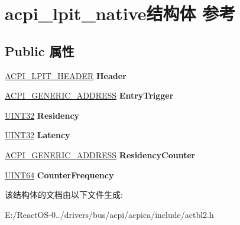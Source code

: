 \hypertarget{structacpi__lpit__native}{}\section{acpi\+\_\+lpit\+\_\+native结构体 参考}
\label{structacpi__lpit__native}
\subsection*{Public 属性}
\begin{DoxyCompactItemize}
\item 
\mbox{\label{structacpi__lpit__native_a3e0cb0780559be37da85e23652a056ac}} 
\hyperlink{structacpi__lpit__header}{A\+C\+P\+I\+\_\+\+L\+P\+I\+T\+\_\+\+H\+E\+A\+D\+ER} {\bfseries Header}
\item 
\mbox{\label{structacpi__lpit__native_ac52aff222fa5c176a196208f0ba02999}} 
\hyperlink{structacpi__generic__address}{A\+C\+P\+I\+\_\+\+G\+E\+N\+E\+R\+I\+C\+\_\+\+A\+D\+D\+R\+E\+SS} {\bfseries Entry\+Trigger}
\item 
\mbox{\label{structacpi__lpit__native_abd22d2b65558c0f5a4fa6759ec971fdf}} 
\hyperlink{_processor_bind_8h_ae1e6edbbc26d6fbc71a90190d0266018}{U\+I\+N\+T32} {\bfseries Residency}
\item 
\mbox{\label{structacpi__lpit__native_a43c8ee4a707ce718811de932875b3339}} 
\hyperlink{_processor_bind_8h_ae1e6edbbc26d6fbc71a90190d0266018}{U\+I\+N\+T32} {\bfseries Latency}
\item 
\mbox{\label{structacpi__lpit__native_a31a66c17dbd8354971b74bb8f2498365}} 
\hyperlink{structacpi__generic__address}{A\+C\+P\+I\+\_\+\+G\+E\+N\+E\+R\+I\+C\+\_\+\+A\+D\+D\+R\+E\+SS} {\bfseries Residency\+Counter}
\item 
\mbox{\label{structacpi__lpit__native_a312ddb3ceafe3e0cf4b6a10895eb45b0}} 
\hyperlink{_processor_bind_8h_a57be03562867144161c1bfee95ca8f7c}{U\+I\+N\+T64} {\bfseries Counter\+Frequency}
\end{DoxyCompactItemize}


该结构体的文档由以下文件生成\+:\begin{DoxyCompactItemize}
\item 
E\+:/\+React\+O\+S-\/0../drivers/bus/acpi/acpica/include/actbl2.\+h\end{DoxyCompactItemize}
